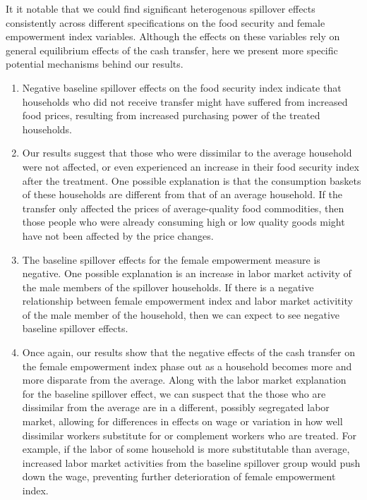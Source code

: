 \documentclass[11pt]{article}
\begin{document}
    It it notable that we could find significant heterogenous spillover effects consistently across different specifications on the food security and female empowerment index variables. Although the effects on these variables rely on general equilibrium effects of the cash transfer, here we present more specific potential mechanisms behind our results. 
    \begin{enumerate}
    	\item Negative baseline spillover effects on the food security index indicate that households who did not receive transfer might have suffered from increased food prices, resulting from increased purchasing power of the treated households. 
    	\item Our results suggest that those who were dissimilar to the average household were not affected, or even experienced an increase in their food security index after the treatment. One possible explanation is that the consumption baskets of these households are different from that of an average household. If the transfer only affected the prices of average-quality food commodities, then those people who were already consuming high or low quality goods might have not been affected by the price changes. 
    	\item The baseline spillover effects for the female empowerment measure is negative. One possible explanation is an increase in labor market activity of the male members of the spillover households. If there is a negative relationship between female empowerment index and labor market activitity of the male member of the household, then we can expect to see negative baseline spillover effects.  
    	\item Once again, our results show that the negative effects of the cash transfer on the female empowerment index phase out as a household becomes more and more disparate from the average. Along with the labor market explanation for the baseline spillover effect, we can suspect that the those who are dissimilar from the average are in a different, possibly segregated labor market, allowing for differences in effects on wage or variation in how well dissimilar workers substitute for or complement workers who are treated. For example, if the labor of some household is more substitutable than average, increased labor market activities from the baseline spillover group would push down the wage, preventing further deterioration of female empowerment index. 
    \end{enumerate}
\end{document}
